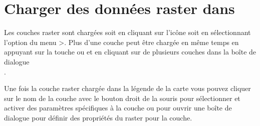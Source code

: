 \section{Charger des données raster dans \qg}\label{label_loadraster}

Les couches raster sont chargées soit en cliquant sur l'icône
 soit en
sélectionnant l'option du menu
>. Plus d'une couche peut être chargée en même temps en appuyant
sur la touche  ou  et en cliquant sur de
plusieurs couches dans la boîte de dialogue\\ .

Une fois la couche raster chargée dans la légende de la carte vous pouvez
cliquer sur le nom de la couche avec le bouton droit de la souris pour
sélectionner et activer des paramètres spécifiques à la couche ou pour ouvrir
une boîte de dialogue pour définir des propriétés du raster pour la couche.


